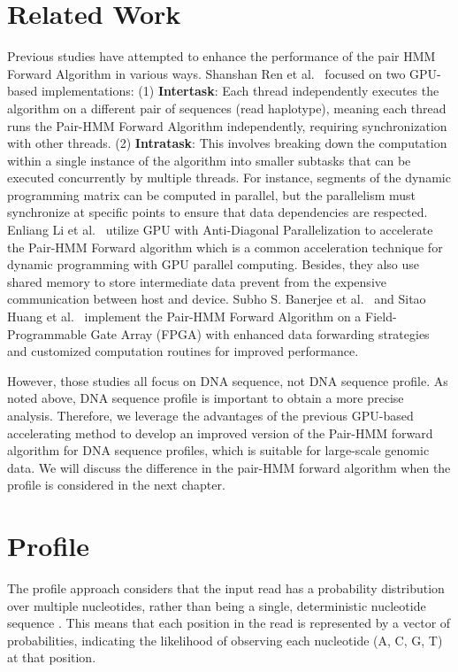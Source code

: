 \documentclass[PhD]{PHlab-thesis}
\begin{document}
\chapter{Related Work}
Previous studies have attempted to enhance the performance of the pair HMM Forward Algorithm in various ways. Shanshan Ren et al.~\cite{Shanshan} focused on two GPU-based implementations: (1) \textbf{Intertask}: Each thread independently executes the algorithm on a different pair of sequences (read haplotype), meaning each thread runs the Pair-HMM Forward Algorithm independently, requiring synchronization with other threads. (2) \textbf{Intratask}: This involves breaking down the computation within a single instance of the algorithm into smaller subtasks that can be executed concurrently by multiple threads. For instance, segments of the dynamic programming matrix can be computed in parallel, but the parallelism must synchronize at specific points to ensure that data dependencies are respected. Enliang Li et al.~\cite{EnliangLi} utilize GPU with Anti-Diagonal Parallelization to accelerate the Pair-HMM Forward algorithm which is a common acceleration technique for dynamic programming with GPU parallel computing. Besides, they also use shared memory to store intermediate data prevent from the expensive communication between host and device. Subho S. Banerjee et al.~\cite{Subho} and Sitao Huang et al.~\cite{Sitao} implement the Pair-HMM Forward Algorithm on a Field-Programmable Gate Array (FPGA) with enhanced data forwarding strategies and customized computation routines for improved performance.

However, those studies all focus on DNA sequence, not DNA sequence profile. As noted above, DNA sequence profile is important to obtain a more precise analysis. Therefore, we leverage the advantages of the previous GPU-based accelerating method to develop an improved version of the Pair-HMM forward algorithm for DNA sequence profiles, which is suitable for large-scale genomic data. We will discuss the difference in the pair-HMM forward algorithm when the profile is considered in the next chapter.

\chapter{Profile}
The profile approach considers that the input read has a probability distribution over multiple nucleotides, rather than being a single, deterministic nucleotide sequence \cite{Emad}. This means that each position in the read is represented by a vector of probabilities, indicating the likelihood of observing each nucleotide (A, C, G, T) at that position.
\end{document}
